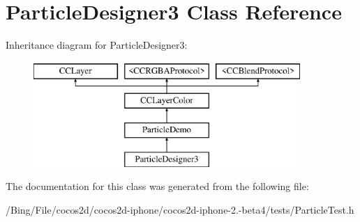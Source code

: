\hypertarget{interface_particle_designer3}{\section{Particle\-Designer3 Class Reference}
\label{interface_particle_designer3}
}
Inheritance diagram for Particle\-Designer3\-:\begin{figure}[H]
\begin{center}
\leavevmode
\includegraphics[height=4.000000cm]{interface_particle_designer3}
\end{center}
\end{figure}


The documentation for this class was generated from the following file\-:\begin{DoxyCompactItemize}
\item 
/\-Bing/\-File/cocos2d/cocos2d-\/iphone/cocos2d-\/iphone-\/2.-\/beta4/tests/Particle\-Test.\-h\end{DoxyCompactItemize}
